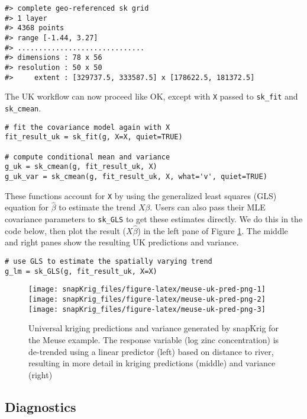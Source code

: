 \begin{verbatim}
#> complete geo-referenced sk grid
#> 1 layer
#> 4368 points
#> range [-1.44, 3.27]
#> ..............................
#> dimensions : 78 x 56
#> resolution : 50 x 50
#>     extent : [329737.5, 333587.5] x [178622.5, 181372.5]
\end{verbatim}

The UK workflow can now proceed like OK, except with \texttt{X} passed to \texttt{sk\_fit} and \texttt{sk\_cmean}.

\begin{verbatim}
# fit the covariance model again with X
fit_result_uk = sk_fit(g, X=X, quiet=TRUE)

# compute conditional mean and variance
g_uk = sk_cmean(g, fit_result_uk, X)
g_uk_var = sk_cmean(g, fit_result_uk, X, what='v', quiet=TRUE)
\end{verbatim}

These functions account for \texttt{X} by using the generalized least squares (GLS) equation for \(\hat{\beta}\) to estimate the trend \(X\beta\). Users can also pass their MLE covariance parameters to \texttt{sk\_GLS} to get these estimates directly. We do this in the code below, then plot the result (\(X\hat{\beta}\)) in the left pane of Figure \ref{fig:meuse-uk-pred-png}. The middle and right panes show the resulting UK predictions and variance.

\begin{verbatim}
# use GLS to estimate the spatially varying trend 
g_lm = sk_GLS(g, fit_result_uk, X=X)
\end{verbatim}

\begin{figure}
\texttt{[image: snapKrig\_files/figure-latex/meuse-uk-pred-png-1]} \texttt{[image: snapKrig\_files/figure-latex/meuse-uk-pred-png-2]} \texttt{[image: snapKrig\_files/figure-latex/meuse-uk-pred-png-3]} \caption{Universal kriging predictions and variance generated by snapKrig for the Meuse example. The response variable (log zinc concentration) is de-trended using a linear predictor (left) based on distance to river, resulting in more detail in kriging predictions (middle) and variance (right)}\label{fig:meuse-uk-pred-png}
\end{figure}

\hypertarget{diagnostics}{%
\subsection{Diagnostics}\label{diagnostics}}

